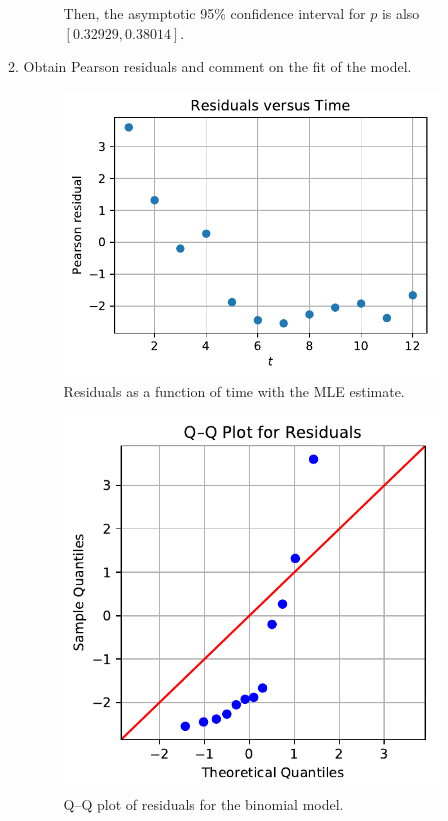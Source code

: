\documentclass[letterpaper,11pt]{article}
\begin{document}
\begin{enumerate}
\begin{enumerate}
\begin{description}
        Then, the asymptotic 95\% confidence interval for $p$ is also
        $\left[0.32929,0.38014\right]$.
      \end{description}
    \item Obtain Pearson residuals and comment on the fit of the model.
      \begin{figure}
        \centering
        \includegraphics{p3_residuals.pdf}
        \caption{Residuals as a function of time with the MLE estimate.}
        \label{fig:p3_residuals}
      \end{figure}

      \begin{figure}
        \centering
        \includegraphics{p3_qq.pdf}
        \caption{Q--Q plot of residuals for the binomial model.}
        \label{fig:p3_qq}
      \end{figure}
            

\end{enumerate}
\end{enumerate}
\end{document}
